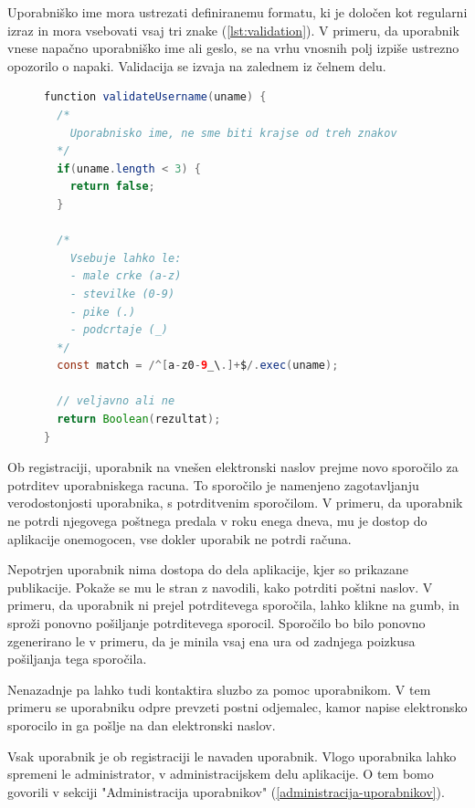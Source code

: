 \documentclass[a4paper, 12pt]{book}
\begin{document}
Uporabniško ime mora ustrezati definiranemu formatu, ki je določen kot regularni izraz in mora vsebovati vsaj tri znake (\ref{lst:validation}). V primeru, da uporabnik vnese napačno uporabniško ime ali geslo, se na vrhu vnosnih polj izpiše ustrezno opozorilo o napaki. Validacija se izvaja na zalednem iz čelnem delu.

\begin{figure}
\centering
\begin{lstlisting}[language=java, style=mystyle,caption={Primer validacijske funkcije za preverjanje uporabniškega imena z uporabo regularnega izraza},label=lst:validation]
function validateUsername(uname) {
  /*
    Uporabnisko ime, ne sme biti krajse od treh znakov
  */
  if(uname.length < 3) {
    return false;
  }

  /* 
    Vsebuje lahko le: 
    - male crke (a-z) 
    - stevilke (0-9)
    - pike (.)
    - podcrtaje (_)
  */
  const match = /^[a-z0-9_\.]+$/.exec(uname);
  
  // veljavno ali ne
  return Boolean(rezultat);
}
\end{lstlisting}
\end{figure}


Ob registraciji, uporabnik na vnešen elektronski naslov prejme novo sporočilo za potrditev uporabniskega racuna. To sporočilo je namenjeno zagotavljanju verodostonjosti uporabnika, s potrditvenim sporočilom. V primeru, da uporabnik ne potrdi njegovega poštnega predala v roku enega dneva, mu je dostop do aplikacije onemogocen, vse dokler uporabik ne potrdi računa.

Nepotrjen uporabnik nima dostopa do dela aplikacije, kjer so prikazane publikacije. Pokaže se mu le stran z navodili, kako potrditi poštni naslov. V primeru, da uporabnik ni prejel potrditevega sporočila, lahko klikne na gumb, in sproži ponovno pošiljanje potrditevega sporocil. Sporočilo bo bilo ponovno zgenerirano le v primeru, da je minila vsaj ena ura od zadnjega poizkusa pošiljanja tega sporočila.

Nenazadnje pa lahko tudi kontaktira sluzbo za pomoc uporabnikom. V tem primeru se uporabniku odpre prevzeti postni odjemalec, kamor napise elektronsko sporocilo in ga pošlje na dan elektronski naslov.

Vsak uporabnik je ob registraciji le navaden uporabnik. Vlogo uporabnika lahko spremeni le administrator, v administracijskem delu aplikacije. O tem bomo govorili v sekciji "Administracija uporabnikov" (\ref{administracija-uporabnikov}).
\end{document}
